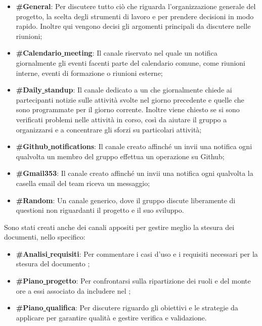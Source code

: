 \documentclass[NormeDiProgetto.tex]{subfiles}
\begin{document}
	\begin{itemize}
		\item \textbf{\#General}: Per discutere tutto ciò che riguarda l'organizzazione generale del progetto, la scelta degli strumenti di lavoro e per prendere decisioni in modo rapido. Inoltre qui vengono decisi gli argomenti principali da discutere nelle riunioni;
		\item \textbf{\#Calendario\underline{ }meeting}: Il canale riservato nel quale un  notifica giornalmente gli eventi facenti parte del calendario comune, come riunioni interne, eventi di formazione o riunioni esterne;
		\item \textbf{\#Daily\underline{ }standup}: Il canale dedicato a un  che giornalmente chiede ai partecipanti notizie sulle attività svolte nel giorno precedente e quelle che sono programmate per il giorno corrente. Inoltre viene chiesto se si sono verificati problemi nelle attività in corso, così da aiutare il gruppo a organizzarsi e a concentrare gli sforzi su particolari attività;
		\item \textbf{\#Github\underline{ }notifications}: Il canale creato affinché un  invii una notifica ogni qualvolta un membro del gruppo effettua un operazione su Github;
		\item \textbf{\#Gmail353}: Il canale creato affinché un  invii una notifica ogni qualvolta la casella email del team riceva un messaggio;
		\item \textbf{\#Random}: Un canale generico, dove il gruppo discute liberamente di questioni non riguardanti il progetto e il suo sviluppo.
		
	\end{itemize}
	Sono stati creati anche dei canali appositi per gestire meglio la stesura dei documenti, nello specifico:
	\begin{itemize}
		\item \textbf{\#Analisi\underline{ }requisiti}: Per commentare i casi d'uso e i requisiti necessari per la stesura del documento \adr;
		\item \textbf{\#Piano\underline{ }progetto}: Per confrontarsi sulla ripartizione dei ruoli e del monte ore a essi associato da includere nel \pdp;
		\item \textbf{\#Piano\underline{ }qualifica}: Per discutere riguardo gli obiettivi e le strategie da applicare per garantire qualità e gestire verifica e validazione.
	\end{itemize}
	
\end{document}
